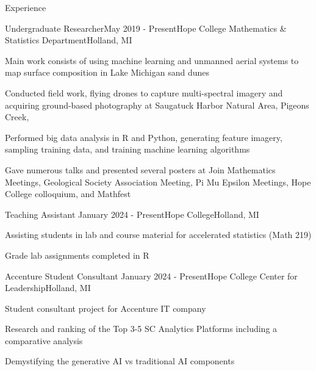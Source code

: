 \documentclass[
	11pt, %
]{resume} %
\begin{document}

\begin{rSection}{Experience}



  \begin{rSubsection}{Undergraduate Researcher}{May 2019 - Present}{Hope College Mathematics \& Statistics Department}{Holland, MI}
  \item Main work consists of using machine learning and unmanned aerial systems to map surface composition in Lake Michigan sand dunes
  \item Conducted field work, flying drones to capture multi-spectral imagery and acquiring  ground-based photography  at Saugatuck Harbor Natural Area, Pigeons Creek,
  \item Performed big data analysis in R and Python, generating feature imagery, sampling training data, and training machine learning algorithms
  \item Gave numerous talks and presented several posters at Join Mathematics Meetings, Geological Society Association Meeting, Pi Mu Epsilon Meetings, Hope College colloquium, and Mathfest
	\end{rSubsection}


\pagebreak
	\begin{rSubsection}{Teaching Assistant}{ January 2024 - Present}{Hope College}{Holland, MI}
    \item Assisting students in lab and course material for accelerated statistics (Math 219)
    \item Grade lab assignments completed in R
	\end{rSubsection}

	\begin{rSubsection}{Accenture Student Consultant}{ January 2024 - Present}{Hope College Center for Leadership}{Holland, MI}
    \item Student consultant project for Accenture IT company 
    \item Research and ranking of the Top 3-5 SC Analytics Platforms including a comparative analysis
    \item Demystifying the generative AI vs traditional AI components
	\end{rSubsection}



\end{rSection}
\end{document}
